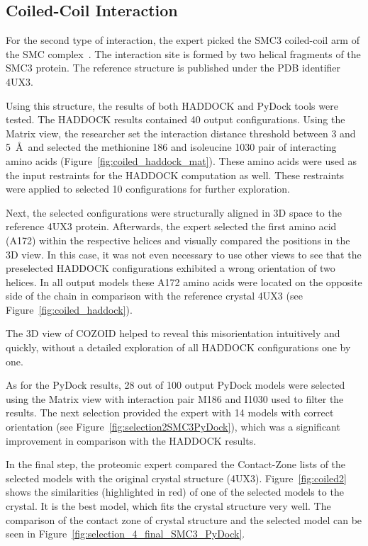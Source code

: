 \documentclass{bmcart}
\def\MatView {Matrix view\xspace}
\def\CoZoLists{Contact-Zone lists\xspace}
\begin{document}
\subsection{Coiled-Coil Interaction}
For the second type of interaction, the expert picked the SMC3 coiled-coil arm of the SMC complex~\cite{Gligoris}.
The interaction site is formed by two helical fragments of the SMC3 protein.
The reference structure is published under the PDB identifier 4UX3.  

Using this structure, the results of both HADDOCK and PyDock tools were tested.
The HADDOCK results contained 40 output configurations.
Using the \MatView, the researcher set the interaction distance threshold between 3 and 5~\AA~and selected the methionine 186 and isoleucine 1030 pair of interacting amino acids (Figure~\ref{fig:coiled_haddock_mat}). 
These amino acids were used as the input restraints for the HADDOCK computation as well.
These restraints were applied to selected 10 configurations for further exploration.

Next, the selected configurations were structurally aligned in 3D space to the reference 4UX3 protein.
Afterwards, the expert selected the first amino acid (A172) within the respective helices and visually compared the positions in the 3D view.
In this case, it was not even necessary to use other views to see that the preselected HADDOCK configurations exhibited a wrong orientation of two helices. 
In all output models these A172 amino acids were located on the opposite side of the chain in comparison with the reference crystal 4UX3 (see Figure~\ref{fig:coiled_haddock}).

The 3D view of COZOID helped to reveal this misorientation intuitively and quickly, without a detailed exploration of all HADDOCK configurations one by one.

As for the PyDock results, 28 out of 100 output PyDock models were selected using the \MatView with interaction pair M186 and I1030 used to filter the results.
The next selection provided the expert with 14 models with correct orientation (see Figure~\ref{fig:selection2SMC3PyDock}), which was a significant improvement in comparison with the HADDOCK results.

In the final step, the proteomic expert compared the \CoZoLists of the selected models with the original crystal structure (4UX3). 
Figure~\ref{fig:coiled2} shows the similarities (highlighted in red) of one of the selected models to the crystal. It is the best model, which fits the crystal structure very well. The comparison of the contact zone of crystal structure and the selected model can be seen in Figure~\ref{fig:selection_4_final_SMC3_PyDock}.
\end{document}
